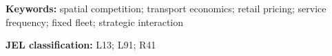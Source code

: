 \noindent\textbf{Keywords:} spatial competition; transport economics; retail pricing; service frequency; fixed fleet; strategic interaction

\medskip
\noindent\textbf{JEL classification:} L13; L91; R41
